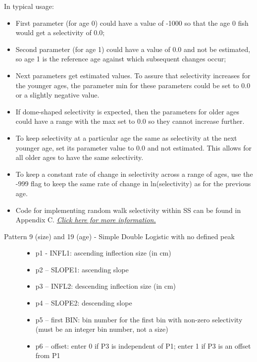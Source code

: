 \begin{description}
	In typical usage:
	\begin{itemize}
		\item First parameter (for age 0) could have a value of -1000 so that the age 0 fish would get a selectivity of 0.0;
		\item 	Second parameter (for age 1) could have a value of 0.0 and not be estimated, so age 1 is the reference age against which subsequent changes occur;
		\item 	Next parameters get estimated values.  To assure that selectivity increases for the younger ages, the parameter min for these parameters could be set to 0.0 or a slightly negative value.
		\item If dome-shaped selectivity is expected, then the parameters for older ages could have a range with the max set to 0.0 so they cannot increase further.
		\item To keep selectivity at a particular age the same as selectivity at the next younger age, set its parameter value to 0.0 and not estimated.  This allows for all older ages to have the same selectivity.
		\item 	To keep a constant rate of change in selectivity across a range of ages, use the -999 flag to keep the same rate of change in ln(selectivity) as for the previous age.
		\item  Code for implementing random walk selectivity within SS can be found in Appendix C. \hyperlink{RandWalkSelex}{\textit{Click here for more information.}}
	\end{itemize}
\end{description}

\begin{description}
	\item[Pattern 9 (size) and 19 (age) - Simple Double Logistic with no defined peak]\hfil
	\begin{itemize}
		\item p1 - INFL1:  ascending inflection size (in cm)
		\item p2 – SLOPE1:  ascending slope
		\item p3 – INFL2:  descending inflection size (in cm)
		\item p4 – SLOPE2:  descending slope
		\item p5 – first BIN: bin number for the first bin with non-zero selectivity (must be an integer bin number, not a size)
		\item p6 – offset:  enter 0 if P3 is independent of P1; enter 1 if P3 is an offset from P1
	\end{itemize}
\end{description}

